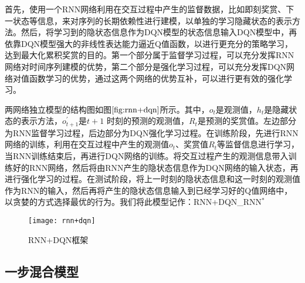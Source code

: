 首先，使用一个RNN网络利用在交互过程中产生的监督数据，比如即刻奖赏、下一状态等信息，来对序列的长期依赖性进行建模，以单独的学习隐藏状态的表示方法。然后，将学习到的隐状态信息作为DQN模型的状态信息输入DQN模型中，再依靠DQN模型强大的非线性表达能力逼近Q值函数，以进行更充分的策略学习，达到最大化累积奖赏的目的。第一个部分属于监督学习过程，可以充分发挥RNN网络对时间序列建模的优势，第二个部分是强化学习过程，可以充分发挥DQN网络对值函数学习的优势，通过这两个网络的优势互补，可以进行更有效的强化学习。


两网络独立模型的结构图如图$\ref{fig:rnn+dqn}$所示。其中，$o_{t}$是观测值，$h_{t}$是隐藏状态的表示方法，$o_{t+1}^{'}$是$t+1$ 时刻的预测的观测值，$R_{t}$是预测的奖赏值。左边部分为RNN监督学习过程，后边部分为DQN强化学习过程。在训练阶段，先进行RNN网络的训练，利用在交互过程中产生的观测值$o_{t}$、奖赏值$R_{t}$等监督信息进行学习，当RNN训练结束后，再进行DQN网络的训练。将交互过程产生的观测信息带入训练好的RNN网络，然后将由RNN产生的隐状态信息作为DQN网络的输入状态，再进行强化学习的过程。在测试阶段，将上一时刻的隐状态信息和这一时刻的观测值作为RNN的输入，然后再将产生的隐状态信息输入到已经学习好的Q值网络中，以贪婪的方式选择最优的行为。我们将此模型记作：RNN+DQN_RNN$^{*}$


\begin{figure}[htbp]
\centering
\texttt{[image: rnn+dqn]}
\caption{RNN+DQN框架}
\label{fig:rnn+dqn}
\end{figure}

\subsection{一步混合模型}

